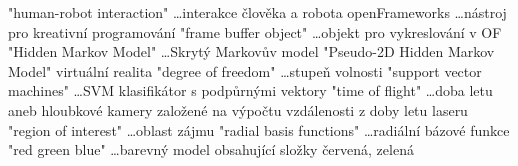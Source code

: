 
\abbrv[HRI]	"human-robot interaction" \dots interakce člověka a robota
\abbrv[OF]	openFrameworks \dots nástroj pro kreativní programování
\abbrv[FBO]  "frame buffer object" \dots objekt pro vykreslování v OF
\abbrv[HMM]  "Hidden Markov Model" \dots Skrytý Markovův model
\abbrv[P2DHMM]  "Pseudo-2D Hidden Markov Model"
\abbrv[VR]  virtuální realita
\abbrv[DOF]  "degree of freedom" \dots stupeň volnosti
\abbrv[SVM]  "support vector machines" \dots SVM klasifikátor s podpůrnými vektory
\abbrv[TOF]  "time of flight" \dots doba letu aneb hloubkové kamery založené na výpočtu vzdálenosti z doby letu laseru
\abbrv[ROI]  "region of interest" \dots oblast zájmu
\abbrv[RBF]  "radial basis functions" \dots radiální bázové funkce
\abbrv[RGB]  "red green blue" \dots barevný model obsahující složky červená, zelená 

\stopAbbreviations

\endinput
